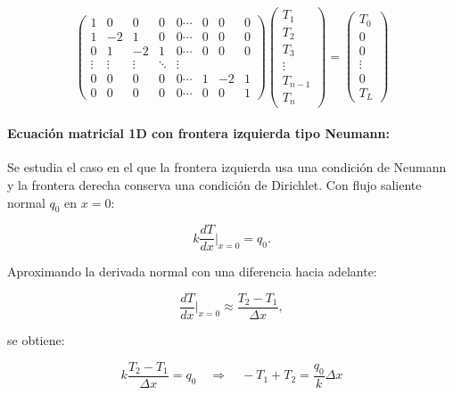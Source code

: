 \documentclass[11pt,a4paper]{article}
\begin{document}
\begin{equation}
\begin{pmatrix}
1 & 0 & 0 & 0 & 0  \cdots & 0 & 0 & 0 \\
1 & -2 & 1 & 0 & 0  \cdots & 0 & 0 & 0 \\
0 & 1 & -2 & 1 & 0  \cdots & 0 & 0 & 0 \\
\vdots & \vdots & \vdots & \ddots & \vdots \\
0 & 0 & 0 & 0 & 0  \cdots & 1 & -2 & 1 \\
0 & 0 & 0 & 0 & 0  \cdots & 0 & 0 & 1
\end{pmatrix}
\begin{pmatrix}
T_1 \\
T_2 \\
T_3 \\
\vdots \\
T_{n-1} \\
T_n
\end{pmatrix}
=
\begin{pmatrix}
T_0 \\
0 \\
0 \\
\vdots \\
0 \\
T_L
\end{pmatrix}
\end{equation}

\medskip

\paragraph{Ecuaci\'on matricial 1D con frontera izquierda tipo Neumann:}

Se estudia el caso en el que la frontera izquierda usa una condici\'on de Neumann
y la frontera derecha conserva una condici\'on de Dirichlet. Con flujo saliente
normal $q_0$ en $x=0$:

\begin{equation}
k\frac{dT}{dx}\bigg|_{x=0}=q_0.
\end{equation}

Aproximando la derivada normal con una diferencia hacia adelante:

\begin{equation}
\frac{dT}{dx}\bigg|_{x=0} \approx \frac{T_2-T_1}{\Delta x},
\end{equation}

se obtiene:

\begin{equation}
k\frac{T_2-T_1}{\Delta x}=q_0
\quad \Rightarrow \quad
-T_1+T_2=\frac{q_0}{k} \Delta x
\end{equation}
\end{document}
